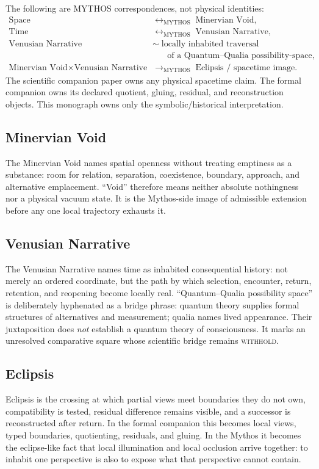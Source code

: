 \documentclass[11pt]{article}
\newcommand{\withhold}{\textsc{withhold}\xspace}
\begin{document}
\begin{mythosregister}
The following are MYTHOS correspondences, not physical identities:
\begin{align}
\text{Space} &\;\longleftrightarrow_{\mathrm{MYTHOS}}\; \text{Minervian Void},\\
\text{Time} &\;\longleftrightarrow_{\mathrm{MYTHOS}}\; \text{Venusian Narrative},\\
\text{Venusian Narrative} &\;\sim\; \text{locally inhabited traversal}\\
&\qquad\text{of a Quantum--Qualia possibility-space},\\
\text{Minervian Void}\times\text{Venusian Narrative}
&\;\longrightarrow_{\mathrm{MYTHOS}}\;\text{Eclipsis / spacetime image}.
\end{align}
The scientific companion paper owns any physical spacetime claim.  The formal
companion owns its declared quotient, gluing, residual, and reconstruction
objects.  This monograph owns only the symbolic/historical interpretation.
\end{mythosregister}

\subsection{Minervian Void}
The Minervian Void names spatial openness without treating emptiness as a
substance: room for relation, separation, coexistence, boundary, approach, and
alternative emplacement.  ``Void'' therefore means neither absolute nothingness
nor a physical vacuum state.  It is the Mythos-side image of admissible extension
before any one local trajectory exhausts it.

\subsection{Venusian Narrative}
The Venusian Narrative names time as inhabited consequential history: not merely
an ordered coordinate, but the path by which selection, encounter, return,
retention, and reopening become locally real.  ``Quantum--Qualia possibility
space'' is deliberately hyphenated as a bridge phrase: quantum theory supplies
formal structures of alternatives and measurement; qualia names lived
appearance.  Their juxtaposition does \emph{not} establish a quantum theory of
consciousness.  It marks an unresolved comparative square whose scientific
bridge remains \withhold.

\subsection{Eclipsis}
Eclipsis is the crossing at which partial views meet boundaries they do not own,
compatibility is tested, residual difference remains visible, and a successor is
reconstructed after return.  In the formal companion this becomes local views,
typed boundaries, quotienting, residuals, and gluing.  In the Mythos it becomes
the eclipse-like fact that local illumination and local occlusion arrive together:
to inhabit one perspective is also to expose what that perspective cannot contain.
\end{document}
